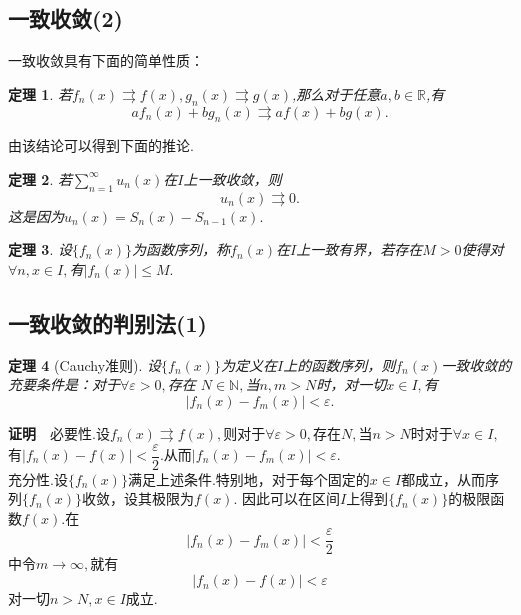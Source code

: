 \documentclass[UTF8]{article}
\newcommand{\R}{\mathbb{R}}
\newcommand{\zm}{\textbf{证明}$\quad$}
\newtheorem{thm}{\hspace{2em}定理}[section]
\begin{document}
\subsection{一致收敛(2)}
一致收敛具有下面的简单性质：
\begin{thm}
  若$f_n(x)\rightrightarrows f(x),g_n(x)\rightrightarrows g(x)$,那么对于任意$a,b\in\R$,有
  $$af_n(x)+bg_n(x)\rightrightarrows af(x)+bg(x).$$
\end{thm}
由该结论可以得到下面的推论.
\begin{thm}
  若$\sum\limits_{n=1}^\infty u_n(x)$在$I$上一致收敛，则
  $$u_n(x)\rightrightarrows 0.$$
  这是因为$u_n(x)=S_n(x)-S_{n-1}(x).$
\end{thm}
\begin{thm}
  设$\{f_n(x)\}$为函数序列，称$f_n(x)$在$I$上一致有界，若存在$M>0$使得对$\forall n,x\in I,$有$|f_n(x)|\le M.$
\end{thm}
\subsection{一致收敛的判别法(1)}
\begin{thm}[Cauchy准则]
  设$\{f_n(x)\}$为定义在$I$上的函数序列，则$f_n(x)$一致收敛的充要条件是：对于$\forall\varepsilon>0,$存在
  $N\in\mathbb{N},$当$n,m>N$时，对一切$x\in I,$有
  $$|f_n(x)-f_m(x)|<\varepsilon.$$
\end{thm}
\zm 必要性.设$f_n(x)\rightrightarrows f(x),$则对于$\forall \varepsilon>0,$存在$N,$当$n>N$时对于$\forall x\in I,$
有$|f_n(x)-f(x)|<\dfrac{\varepsilon}{2}.$从而$|f_n(x)-f_m(x)|<\varepsilon.$\\
充分性.设$\{f_n(x)\}$满足上述条件.特别地，对于每个固定的$x\in I$都成立，从而序列$\{f_n(x)\}$收敛，设其极限为$f(x)$.
因此可以在区间$I$上得到$\{f_n(x)\}$的极限函数$f(x)$.在
$$|f_n(x)-f_m(x)|<\frac{\varepsilon}{2}$$中令$m\to\infty,$就有
$$|f_n(x)-f(x)|<\varepsilon$$对一切$n>N,x\in I$成立.
\end{document}
